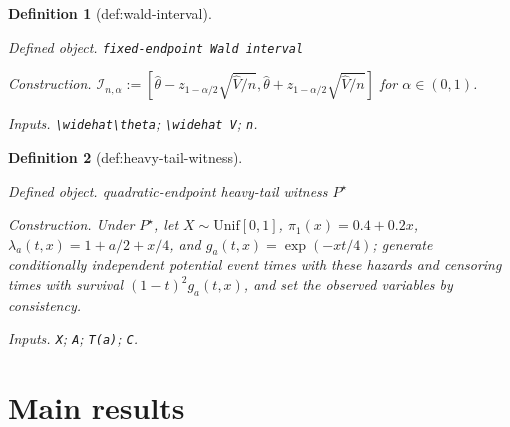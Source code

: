 \documentclass{article}
\newtheorem{definition}{Definition}
\begin{document}
\begin{definition}[def:wald-interval]\label{def:wald-interval}
\par\smallskip\noindent\emph{Defined object.} \texttt{fixed-\allowbreak{}endpoint Wald interval}
\par\smallskip\noindent\emph{Construction.} \(\mathcal I_{n,\alpha}:=[\widehat\theta-z_{1-\alpha/2}\sqrt{\widehat V/n},\widehat\theta+z_{1-\alpha/2}\sqrt{\widehat V/n}]\) for \(\alpha\in(0,1)\).
\par\smallskip\noindent\emph{Inputs.} \texttt{\textbackslash{}\allowbreak{}widehat\textbackslash{}\allowbreak{}theta}; \texttt{\textbackslash{}\allowbreak{}widehat V}; \texttt{n}.
\end{definition}

\begin{definition}[def:heavy-tail-witness]\label{def:heavy-tail-witness}
\par\smallskip\noindent\emph{Defined object.} quadratic-endpoint heavy-tail witness \(P^{\star}\)
\par\smallskip\noindent\emph{Construction.} Under \(P^{\star}\), let \(X\sim\mathrm{Unif}[0,1]\), \(\pi_1(x)=0.4+0.2x\), \(\lambda_a(t,x)=1+a/2+x/4\), and \(g_a(t,x)=\exp(-xt/4)\); generate conditionally independent potential event times with these hazards and censoring times with survival \((1-t)^2g_a(t,x)\), and set the observed variables by consistency.
\par\smallskip\noindent\emph{Inputs.} \texttt{X}; \texttt{A}; \texttt{T(a)}; \texttt{C}.
\end{definition}

\section{Main results}
\end{document}

